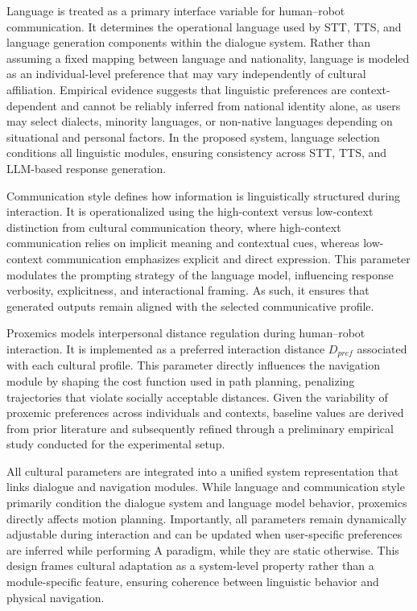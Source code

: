Language is treated as a primary interface variable for human–robot communication. It determines the operational language used by STT, TTS, and language generation components within the dialogue system. Rather than assuming a fixed mapping between language and nationality, language is modeled as an individual-level preference that may vary independently of cultural affiliation. Empirical evidence suggests that linguistic preferences are context-dependent and cannot be reliably inferred from national identity alone, as users may select dialects, minority languages, or non-native languages depending on situational and personal factors. In the proposed system, language selection conditions all linguistic modules, ensuring consistency across STT, TTS, and LLM-based response generation.

Communication style defines how information is linguistically structured during interaction. It is operationalized using the high-context versus low-context distinction from cultural communication theory, where high-context communication relies on implicit meaning and contextual cues, whereas low-context communication emphasizes explicit and direct expression. This parameter modulates the prompting strategy of the language model, influencing response verbosity, explicitness, and interactional framing. As such, it ensures that generated outputs remain aligned with the selected communicative profile.

Proxemics models interpersonal distance regulation during human–robot interaction. It is implemented as a preferred interaction distance $D_{pref}$ associated with each cultural profile. This parameter directly influences the navigation module by shaping the cost function used in path planning, penalizing trajectories that violate socially acceptable distances. Given the variability of proxemic preferences across individuals and contexts, baseline values are derived from prior literature and subsequently refined through a preliminary empirical study conducted for the experimental setup.

All cultural parameters are integrated into a unified system representation that links dialogue and navigation modules. While language and communication style primarily condition the dialogue system and language model behavior, proxemics directly affects motion planning. Importantly, all parameters remain dynamically adjustable during interaction and can be updated when user-specific preferences are inferred while performing A paradigm, while they are static otherwise. This design frames cultural adaptation as a system-level property rather than a module-specific feature, ensuring coherence between linguistic behavior and physical navigation.

